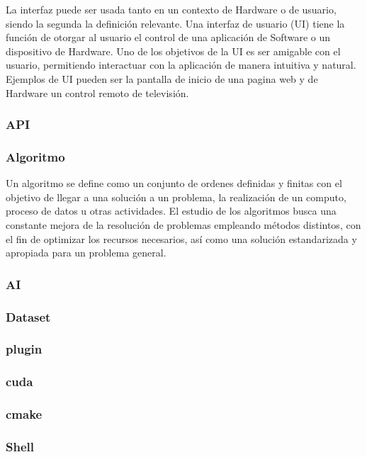 La interfaz puede ser usada tanto en un contexto de Hardware o de usuario, siendo la segunda la definición relevante.
Una interfaz de usuario (UI) tiene la función de otorgar al usuario el control de una aplicación de Software o un dispositivo de Hardware. Uno de los objetivos de la UI es ser amigable con el usuario, permitiendo interactuar con la aplicación de manera intuitiva y natural. Ejemplos de UI pueden ser la pantalla de inicio de una pagina web y de Hardware un control remoto de televisión.

\subsubsection{API}

\subsubsection{Algoritmo}

Un algoritmo se define como un conjunto de ordenes definidas y finitas con el objetivo de llegar a una solución a un problema, la realización de un computo, proceso de datos u otras actividades. El estudio de los algoritmos busca una constante mejora de la resolución de problemas empleando métodos distintos, con el fin de optimizar los recursos necesarios, así como una solución estandarizada y apropiada para un problema general.

\subsubsection{AI}
\subsubsection{Dataset}
\subsubsection{plugin}
\subsubsection{cuda}
\subsubsection{cmake}
\subsubsection{Shell}


